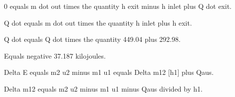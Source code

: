 0 equals m dot out times the quantity h exit minus h inlet plus Q dot exit.  

Q dot equals m dot out times the quantity h inlet plus h exit.  

Q dot equals Q dot times the quantity 449.04 plus 292.98.  

Equals negative 37.187 kilojoules.

Delta E equals m2 u2 minus m1 u1 equals Delta m12 [h1] plus Qaus.  

Delta m12 equals m2 u2 minus m1 u1 minus Qaus divided by h1.